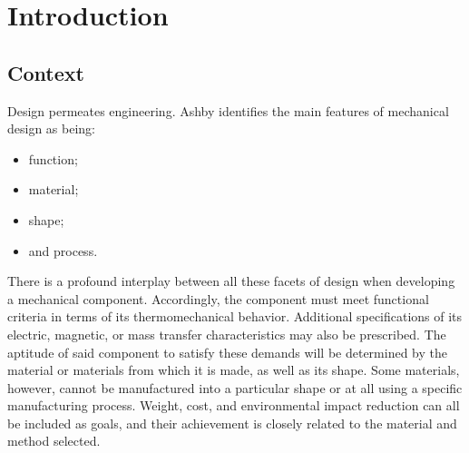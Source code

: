 \chapter{Introduction}

\section{Context}

Design permeates engineering.
Ashby \citep{ashbyMaterialsSelectionMechanical1999} identifies the main features of mechanical design as being:
\begin{itemize}
    \item function;
    \item material;
    \item shape;
    \item and process.
\end{itemize}
There is a profound interplay between all these facets of design when developing a mechanical component.
Accordingly, the component must meet functional criteria in terms of its thermomechanical behavior.
Additional specifications of its electric, magnetic, or mass transfer characteristics may also be prescribed.
The aptitude of said component to satisfy these demands will be determined by the material or materials from which it is made, as well as its shape.
Some materials, however, cannot be manufactured into a particular shape or at all using a specific manufacturing process.
Weight, cost, and environmental impact reduction can all be included as goals, and their achievement is closely related to the material and method selected.

